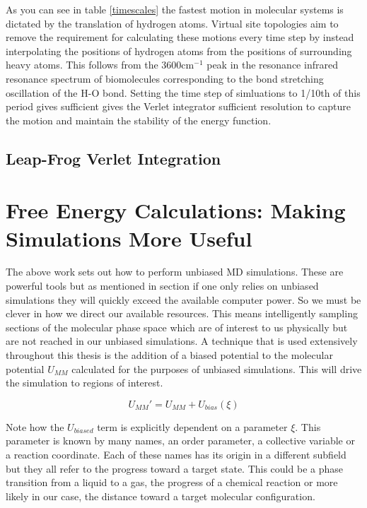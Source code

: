 As you can see in table \ref{timescales} the fastest motion in molecular systems is dictated by the translation of hydrogen atoms. Virtual site topologies aim to remove the requirement for calculating these motions every time step by instead interpolating the positions of hydrogen atoms from the positions of surrounding heavy atoms. This follows from the 3600cm$^{-1}$ peak in the resonance infrared resonance spectrum of biomolecules corresponding to the bond stretching oscillation of the H-O bond. \cite{schlick2010} Setting the time step of simluations to 1/10th of this period gives sufficient gives the Verlet integrator sufficient resolution to capture the motion and maintain the stability of the energy function.
\subsection{Leap-Frog Verlet Integration}

\section{Free Energy Calculations: Making Simulations More Useful}
The above work sets out how to perform unbiased MD simulations. These are powerful tools but as mentioned in section  if one only relies on unbiased simulations they will quickly exceed the available computer power. So we must be clever in how we direct our available resources. This means intelligently sampling sections of the molecular phase space which are of interest to us physically but are not reached in our unbiased simulations. A technique that is used extensively throughout this thesis is the addition of a biased potential to the molecular potential $U_{MM}$ calculated for the purposes of unbiased simulations. This will drive the simulation to regions of interest. 

\begin{equation}
U_{MM}'  = U_{MM} + U_{bias} (\xi)
\end{equation}

Note how the $U_{biased}$ term is explicitly dependent on a parameter $\xi$. This parameter is known by many names, an order parameter, a collective variable or a reaction coordinate. Each of these names has its origin in a different subfield but they all refer to the progress toward a target state. This could be a phase transition from a liquid to a gas, the progress of a chemical reaction or more likely in our case, the distance toward a target molecular configuration. 

